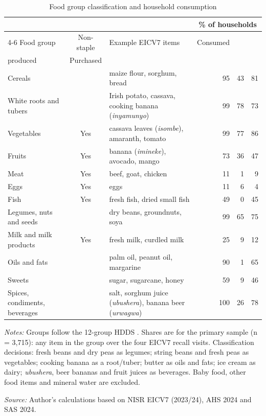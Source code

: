 \begin{table}[htbp]
\centering
\caption{Food group classification and household consumption}
\label{tab:foodgroups}
\footnotesize
\setlength{\tabcolsep}{4pt}
\begin{tabularx}{\linewidth}{l c X r r r}
\toprule
 & & & \multicolumn{3}{c}{\% of households} \\
\cmidrule(l){4-6}
Food group & Non-staple & Example EICV7 items & Consumed & \begin{tabular}[c]{@{}c@{}}Own-\\produced\end{tabular} & Purchased \\
\midrule
Cereals &  & maize flour, sorghum, bread & 95 & 43 & 81 \\
White roots and tubers &  & Irish potato, cassava, cooking banana (\textit{inyamunyo}) & 99 & 78 & 73 \\
Vegetables & Yes & cassava leaves (\textit{isombe}), amaranth, tomato & 99 & 77 & 86 \\
Fruits & Yes & banana (\textit{imineke}), avocado, mango & 73 & 36 & 47 \\
Meat & Yes & beef, goat, chicken & 11 & 1 & 9 \\
Eggs & Yes & eggs & 11 & 6 & 4 \\
Fish & Yes & fresh fish, dried small fish & 49 & 0 & 45 \\
Legumes, nuts and seeds &  & dry beans, groundnuts, soya & 99 & 65 & 75 \\
Milk and milk products & Yes & fresh milk, curdled milk & 25 & 9 & 12 \\
Oils and fats &  & palm oil, peanut oil, margarine & 90 & 1 & 65 \\
Sweets &  & sugar, sugarcane, honey & 59 & 9 & 46 \\
Spices, condiments, beverages &  & salt, sorghum juice (\textit{ubushera}), banana beer (\textit{urwagwa}) & 100 & 26 & 78 \\
\bottomrule
\end{tabularx}

\vspace{0.5em}
\begin{minipage}{\linewidth}
\footnotesize
\textit{Notes:} Groups follow the 12-group HDDS \parencite{swindaleHouseholdDietaryDiversity}. Shares are for the primary sample (n = 3{,}715): any item in the group over the four EICV7 recall visits. Classification decisions: fresh beans and dry peas as legumes; string beans and fresh peas as vegetables; cooking banana as a root/tuber; butter as oils and fats; ice cream as dairy; \textit{ubushera}, beer bananas and fruit juices as beverages. Baby food, other food items and mineral water are excluded.

\vspace{0.3em}
\textit{Source:} Author's calculations based on NISR EICV7 (2023/24), AHS 2024 and SAS 2024.
\end{minipage}
\end{table}
